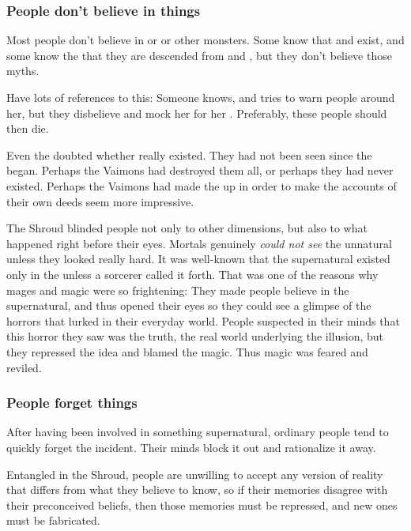 \subsubsection{People don't believe in things}
Most people don't believe in \dragons{} or \banes{} or other monsters. Some know that \resphain{} and \rachyth{} exist, and some know the  that they are descended from \dragons{} and \banes, but they don't believe those myths. 

Have lots of references to this: 
Someone knows, and tries to warn people around her, but they disbelieve and mock her for her . 
Preferably, these people should then die. 

Even the \rethyaxes doubted whether \dragons really existed.
They had not been seen since the  began.
Perhaps the Vaimons had destroyed them all, or perhaps they had never existed.
Perhaps the Vaimons had made the \dragons up in order to make the accounts of their own deeds seem more impressive.

The Shroud blinded people not only to other dimensions, but also to what happened right before their eyes.
Mortals genuinely \emph{could not see} the unnatural unless they looked really hard. 
It was well-known that the supernatural existed only in the \wylde\dash unless a sorcerer called it forth.
That was one of the reasons why mages and magic were so frightening:
They made people believe in the supernatural, and thus opened their eyes so they could see a glimpse of the horrors that lurked in their everyday world. 
People suspected in their minds that this horror they saw was the truth, the real world underlying the illusion, but they repressed the idea and blamed the magic. 
Thus magic was feared and reviled. 





\subsubsection{People forget things}
After having been involved in something supernatural, ordinary people tend to quickly forget the incident. Their minds block it out and rationalize it away. 

Entangled in the Shroud, people are unwilling to accept any version of reality that differs from what they believe to know, so if their memories disagree with their preconceived beliefs, then those memories must be repressed, and new ones must be fabricated.

